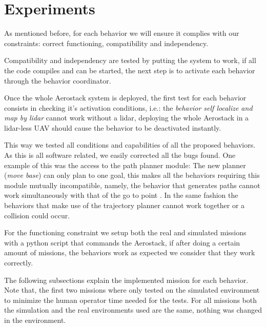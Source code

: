 \section{Experiments} \label{ch_5:sect:experiments}

  As mentioned before, for each behavior we will ensure it complies with our constraints: correct functioning, compatibility and independency. 
  
  Compatibility and independency are tested by putting the system to work, if all the code compiles and can be started, the next step is to activate each behavior through the behavior coordinator.

  Once the whole Aerostack system is deployed, the first test for each behavior consists in checking it's activation conditions, i.e.: the \textit{behavior self localize and map by lidar} cannot work without a lidar, deploying the whole Aerostack in a lidar-less UAV should cause the behavior to be deactivated instantly.

  This way we tested all conditions and capabilities of all the proposed behaviors. As this is all software related, we easily corrected all the bugs found. One example of this was the access to the path planner module: The new planner (\textit{move base}) can only plan to one goal, this makes all the behaviors requiring this module mutually incompatible, namely, the behavior that generates paths cannot work simultaneously with that of the go to point . In the same fashion the behaviors that make use of the trajectory planner cannot work together or a collision could occur.

  For the functioning constraint we setup both the real and simulated missions with a python script that commands the Aerostack, if after doing a certain amount of missions, the behaviors work as expected we consider that they work correctly. 
  

  The following subsections explain the implemented mission for each behavior. Note that, the first two missions where only tested on the simulated environment to minimize the human operator time needed for the tests. For all missions both the simulation and the real environments used are the same, nothing was changed in the environment.

